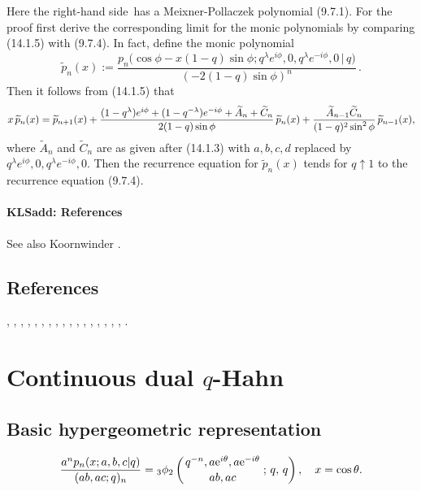 \documentclass[envcountchap,graybox]{svmono}
\newcounter{rom}
\newcommand{\qhyp}[5]{\mbox{}_{#1}{\phi}_{#2}
\left(\genfrac{}{}{0pt}{}{#3}{#4}\,;\,q,\,#5\right)}
\newcommand{\e}{\textrm{e}}
\newcommand\la\lambda
\newcommand\wt{\widetilde}
\newcommand{\qhyp}[5]{\,\mbox{}_{#1}\phi_{#2}\!\left(
  \genfrac{}{}{0pt}{}{#3}{#4};#5\right)}
\newcommand\RHS{right-hand side}
\begin{document}
Here the \RHS\ has a Meixner-Pollaczek polynomial (9.7.1).
For the proof first derive the corresponding limit for the monic polynomials by comparing
(14.1.5) with (9.7.4).
In fact, define the monic polynomial
\[
\wt p_n(x):=
\frac{p_n\big(\cos\phi-x(1-q)\sin\phi;
q^\la e^{i\phi},0,q^\la e^{-i\phi},0\,|\, q\big)}{(-2(1-q)\sin\phi)^n}\,.
\]
Then it follows from (14.1.5) that
\begin{equation*}
x\,\wt p_n(x)=\wt p_{n+1}(x)
+\frac{(1-q^\la)e^{i\phi}+(1-q^{-\la})e^{-i\phi}+\wt A_n+\wt C_n}
{2(1-q)\sin\phi}\,\wt p_n(x)\\
+\frac{\wt A_{n-1} \wt C_n}{(1-q)^2 \sin^2\phi}\,\wt p_{n-1}(x),
\end{equation*}
where $\wt A_n$ and $\wt C_n$ are as given after (14.1.3) with $a,b,c,d$ replaced by
$q^\la e^{i\phi},0,q^\la e^{-i\phi},0$.
Then the recurrence equation for $\wt p_n(x)$ tends for $q\uparrow 1$ to
the recurrence equation (9.7.4).
%
\paragraph{\large\bf KLSadd: References}See also Koornwinder \cite{K7}.
%

\subsection*{References}
\cite{AlSalam90}, \cite{AlSalamVerma82II}, \cite{AndrewsAskey85},
\cite{AskeyWilson79}, \cite{AskeyWilson85}, \cite{AtakRahmanSuslov},
\cite{LChihara87}, \cite{LChihara93}, \cite{Fischer94},
\cite{GasperRahman83I}, \cite{GasperRahman84}, \cite{GasperRahman90},
\cite{Ismail86I}, \cite{Jain92}, \cite{Koorn90II}, \cite{Nikiforov+},
\cite{Perlstadt}, \cite{Rahman82}.


\section{Continuous dual $q$-Hahn}
\par\setcounter{equation}{0}

\subsection*{Basic hypergeometric representation}
\begin{equation}
\label{DefContDualqHahn}
\frac{a^np_n(x;a,b,c|q)}{(ab,ac;q)_n}
=\qhyp{3}{2}{q^{-n},a\e^{i\theta},a\e^{-i\theta}}{ab,ac}{q},\quad x=\cos\theta.
\end{equation}
\end{document}
